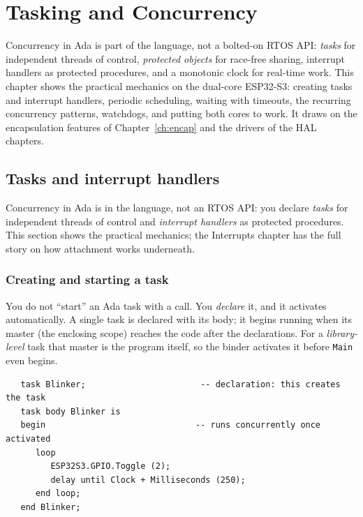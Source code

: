 \chapter{Tasking and Concurrency}
\label{ch:tasking}

Concurrency in Ada is part of the language, not a bolted-on RTOS API: \emph{tasks}
for independent threads of control, \emph{protected objects} for race-free sharing,
interrupt handlers as protected procedures, and a monotonic clock for real-time
work. This chapter shows the practical mechanics on the dual-core ESP32-S3:
creating tasks and interrupt handlers, periodic scheduling, waiting with timeouts,
the recurring concurrency patterns, watchdogs, and putting both cores to work. It
draws on the encapsulation features of Chapter~\ref{ch:encap} and the drivers of
the HAL chapters.

\section{Tasks and interrupt handlers}
\label{sec:tasks}

Concurrency in Ada is in the language, not an RTOS API: you declare \emph{tasks}
for independent threads of control and \emph{interrupt handlers} as protected
procedures. This section shows the practical mechanics; the Interrupts chapter has
the full story on how attachment works underneath.

\subsection{Creating and starting a task}

You do not ``start'' an Ada task with a call. You \emph{declare} it, and it
activates automatically. A single task is declared with its body; it begins
running when its master (the enclosing scope) reaches the code after the
declarations. For a \emph{library-level} task that master is the program itself,
so the binder activates it before \texttt{Main} even begins.


\begin{lstlisting}
   task Blinker;                       -- declaration: this creates the task
   task body Blinker is
   begin                              -- runs concurrently once activated
      loop
         ESP32S3.GPIO.Toggle (2);
         delay until Clock + Milliseconds (250);
      end loop;
   end Blinker;
\end{lstlisting}


